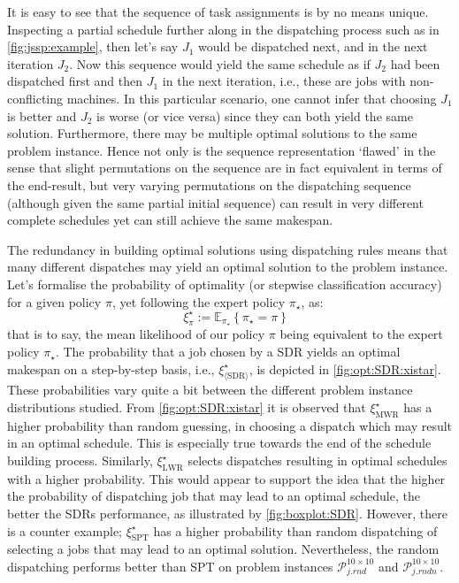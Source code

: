 \documentclass[twocolumn]{svjour3}
\newcommand{\Problem}[2][ ]{$\mathcal{P}_{#2}^{#1}$}
\newcommand{\jrnd}[2]{\Problem[#1 \times #2]{j.rnd}}
\newcommand{\jrndn}[2]{\Problem[#1 \times #2]{j.rndn}}
\begin{document}
It is easy to see that the sequence of task assignments is by no means unique. 
Inspecting a partial schedule further along in the dispatching process such as 
in \cref{fig:jssp:example}, then let's say $J_1$ would be dispatched next, and 
in the next iteration $J_2$. Now this sequence would yield the same schedule as 
if $J_2$ had been dispatched first and then $J_1$ in the next iteration, 
i.e., these are jobs with non-conflicting machines. 
In this particular scenario, one cannot infer that choosing $J_1$ is better 
and $J_2$ is worse (or vice versa) since they can both yield the same solution.
Furthermore, 
there may be multiple optimal solutions to the same 
problem instance. Hence not only is the sequence representation `flawed' in the 
sense that slight permutations on the sequence are in fact equivalent in terms 
of the end-result, but very varying permutations on the dispatching sequence 
(although given the same partial initial sequence) can result in very different 
complete schedules yet can still achieve the same makespan. 

The redundancy in building optimal solutions using dispatching rules means that 
many different dispatches may yield an optimal solution to the problem instance.
Let's formalise the probability of optimality (or stepwise 
classification accuracy) for a given policy $\pi$, yet following the expert 
policy $\pi_\star$, as:
\begin{equation}\quad \label{eq:tracc:opt}
\xi^\star_{\pi} := \mathbb{E}_{\pi_\star}\left\{\pi_{\star} = \pi \right\}
\end{equation}
that is to say, the mean likelihood of our policy $\pi$ being equivalent to the 
expert policy $\pi_\star$.
The probability that a job chosen by a SDR yields an optimal makespan on a 
step-by-step basis, i.e., $\xi^\star_{\langle \text{SDR} \rangle}$, is depicted 
in \cref{fig:opt:SDR:xistar}. These probabilities
vary quite a bit between the different problem instance distributions studied. 
From \cref{fig:opt:SDR:xistar} it is observed that $\xi^\star_{\text{MWR}}$ has 
a higher probability than random guessing, in choosing a dispatch which may 
result in an optimal schedule. This is especially true towards the end of the 
schedule building process. 
Similarly, $\xi^\star_{\text{LWR}}$ selects dispatches 
resulting in optimal schedules with a higher probability. This would appear to 
support the idea that the higher the probability of dispatching job that 
may lead to an optimal schedule, the better the SDRs performance, as 
illustrated by \cref{fig:boxplot:SDR}. However, there is a counter example; 
$\xi^\star_{\text{SPT}}$ has a higher probability than random dispatching of 
selecting a jobs that may lead to an optimal solution. Nevertheless, the random 
dispatching performs better than SPT on problem instances \jrnd{10}{10} and 
\jrndn{10}{10}. 
\end{document}
